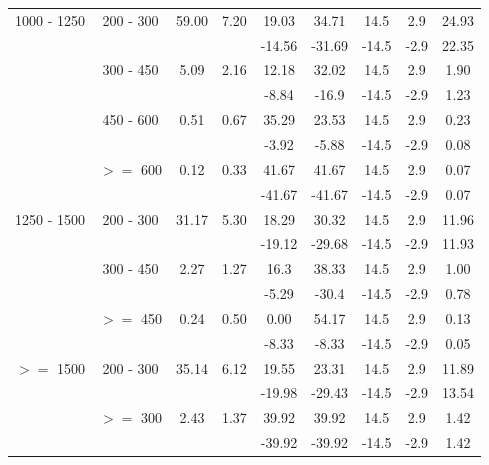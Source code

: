 \begin{table}[htbp]
\begin{center}
\begin{tabular} {c|c|c|c|c|c|c|c|c}
    1000 - 1250 & 200 - 300 & 59.00 & 7.20 & 19.03 & 34.71 & 14.5 & 2.9 & 24.93 \\ 
    & & & & -14.56 & -31.69 & -14.5 & -2.9 & 22.35 \\ 
    & 300 - 450 & 5.09 & 2.16 & 12.18 & 32.02 & 14.5 & 2.9 & 1.90 \\ 
    & & & & -8.84 & -16.9 & -14.5 & -2.9 & 1.23 \\ 
    & 450 - 600 & 0.51 & 0.67 & 35.29 & 23.53 & 14.5 & 2.9 & 0.23 \\ 
    & & & & -3.92 & -5.88 & -14.5 & -2.9 & 0.08 \\ 
    &  $>=$ 600 & 0.12 & 0.33 & 41.67 & 41.67 & 14.5 & 2.9 & 0.07 \\ 
    & & & & -41.67 & -41.67 & -14.5 & -2.9 & 0.07 \\ 
    \hline
    1250 - 1500 & 200 - 300 & 31.17 & 5.30 & 18.29 & 30.32 & 14.5 & 2.9 & 11.96 \\ 
    & & & & -19.12 & -29.68 & -14.5 & -2.9 & 11.93 \\ 
    & 300 - 450 & 2.27 & 1.27 & 16.3 & 38.33 & 14.5 & 2.9 & 1.00 \\ 
    & & & & -5.29 & -30.4 & -14.5 & -2.9 & 0.78 \\ 
    &  $>=$ 450 & 0.24 & 0.50 & 0.00 & 54.17 & 14.5 & 2.9 & 0.13 \\ 
    & & & & -8.33 & -8.33 & -14.5 & -2.9 & 0.05 \\ 
    \hline
    $>=$ 1500 & 200 - 300 & 35.14 & 6.12 & 19.55 & 23.31 & 14.5 & 2.9 & 11.89 \\ 
    & & & & -19.98 & -29.43 & -14.5 & -2.9 & 13.54 \\ 
    &  $>=$ 300 & 2.43 & 1.37 & 39.92 & 39.92 & 14.5 & 2.9 & 1.42 \\ 
    & & & & -39.92 & -39.92 & -14.5 & -2.9 & 1.42 \\ 
    \hline
    \end{tabular}
  \end{center}
\end{table}


